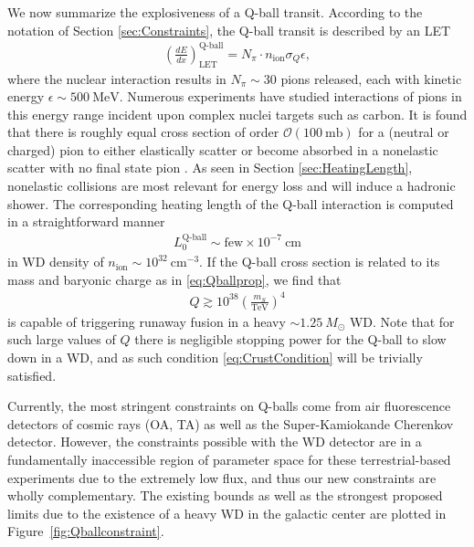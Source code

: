 \documentclass[twocolumn,showpacs,preprintnumbers,amsmath,amssymb,prd]{revtex4}
\newcommand{\OO}{\mathcal{O}}
\def\r{\right)}
\def\l{\left(}
\begin{document}
We now summarize the explosiveness of a Q-ball transit.
According to the notation of Section \ref{sec:Constraints}, the Q-ball transit is described by an LET
\begin{align}
\left( \frac{d E}{d x} \right)^\text{Q-ball}_\text{LET} = N_\pi \cdot n_\text{ion} \sigma_Q \epsilon,
\end{align}
where the nuclear interaction results in $N_\pi \sim 30$ pions released, each with kinetic energy $\epsilon \sim 500 ~\text{MeV}$.
Numerous experiments have studied interactions of pions in this energy range incident upon complex nuclei targets such as carbon.
It is found that there is roughly equal cross section of order $\OO (100 ~\text{mb})$ for a (neutral or charged) pion to either elastically scatter or become absorbed in a nonelastic scatter with no final state pion \cite{Pionnuclear}.
As seen in Section \ref{sec:HeatingLength}, nonelastic collisions are most relevant for energy loss and will induce a hadronic shower.
The corresponding heating length of the Q-ball interaction is computed in a straightforward manner
\begin{align}
L_0^\text{Q-ball} \sim \text{few} \times 10^{-7} ~\text{cm}
\end{align}
in WD density of $n_\text{ion} \sim 10^{32} ~\text{cm}^{-3}$.
If the Q-ball cross section is related to its mass and baryonic charge as in \eqref{eq:Qballprop}, we find that 
\begin{align}
Q \gtrsim 10^{38} \l\frac{m_S}{\text{TeV}}\r^4
\end{align}
is capable of triggering runaway fusion in a heavy $\sim 1.25 ~M_{\odot}$ WD.
Note that for such large values of $Q$ there is negligible stopping power for the Q-ball to slow down in a WD, and as such condition \eqref{eq:CrustCondition} will be trivially satisfied.

Currently, the most stringent constraints on Q-balls come from air fluorescence detectors of cosmic rays (OA, TA) as well as the Super-Kamiokande Cherenkov detector.
However, the constraints possible with the WD detector are in a fundamentally inaccessible region of parameter space for these terrestrial-based experiments due to the extremely low flux, and thus our new constraints are wholly complementary.
The existing bounds as well as the strongest proposed limits due to the existence of a heavy WD in the galactic center are plotted in Figure~\ref{fig:Qballconstraint}.
\end{document}
